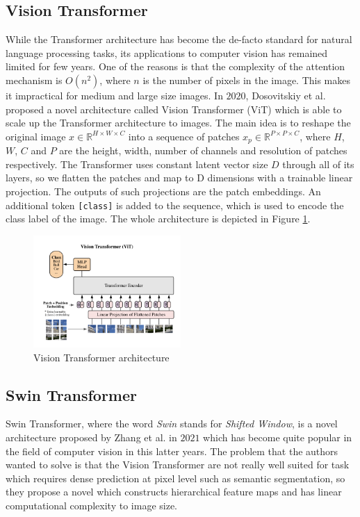 \subsection{Vision Transformer}
While the Transformer architecture has become the de-facto standard for natural
language processing tasks, its applications to computer vision has remained
limited for few years. One of the reasons is that the complexity of the
attention mechanism is $O(n^2)$, where $n$ is the number of pixels in the image.
This makes it impractical for medium and large size images. In $2020$,
Dosovitskiy et al. proposed a novel architecture called Vision Transformer (ViT)
which is able to scale up the Transformer architecture to images. The main idea
is to reshape the original image $x \in \mathbb{R}^{H \times W \times C}$ into a
sequence of patches $x_p \in \mathbb{R}^{P \times P \times C}$, where $H$, $W$,
$C$ and $P$ are the height, width, number of channels and resolution of patches
respectively. The Transformer uses constant latent vector size $D$ through all
of its layers, so we flatten the patches and map to D dimensions with a
trainable linear projection. The outputs of such projections are the patch
embeddings. An additional token \texttt{[class]} is added to the sequence, which
is used to encode the class label of the image. The whole architecture is
depicted in Figure \ref{fig:visiontransformer}.

\begin{figure}[ht!]
  \centering
  \includegraphics[width=0.5\textwidth]{Images/ViT.png}
  \caption{Vision Transformer architecture}
  \label{fig:visiontransformer}
\end{figure}


\subsection{Swin Transformer}
Swin Transformer, where the word \emph{Swin} stands for \emph{Shifted Window},
is a novel architecture proposed by Zhang et al. in $2021$ which has become
quite popular in the field of computer vision in this latter years. The problem
that the authors wanted to solve is that the Vision Transformer are not really
well suited for task which requires dense prediction at pixel level such as
semantic segmentation, so they propose a novel which constructs hierarchical
feature maps and has linear computational complexity to image size.

